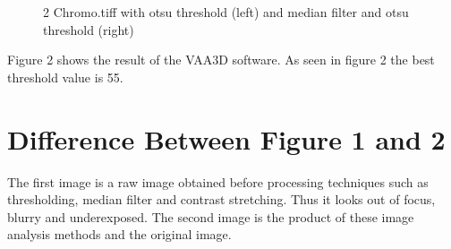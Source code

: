 \documentclass{article}
\begin{document}
\begin{figure}%
    \centering
     \label{fig:Otsu}%
    \qquad
    \caption{2 Chromo.tiff with otsu threshold (left) and median filter and otsu threshold (right)}%
    \label{fig:otsu-median}%
\end{figure}

Figure 2 shows the result of the VAA3D software. As seen in figure 2 the best threshold value is 55. 

\section*{Difference Between Figure 1 and 2}

The first image is a raw image obtained before processing techniques such as thresholding, median filter and contrast stretching. Thus it looks out of focus, blurry and underexposed. The second image is the product of these image analysis methods and the original image. 





\end{document}
